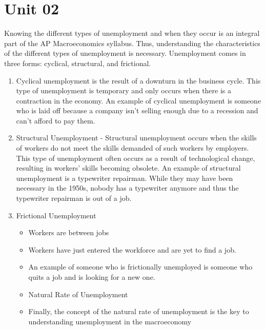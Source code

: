 \documentclass{scrreprt} %
\begin{document}
\section{Unit 02}

Knowing the different types of unemployment and when they occur is an integral
part of the AP Macroeconomics syllabus. Thus, understanding the characteristics
of the different types of unemployment is necessary. Unemployment comes in three
forms: cyclical, structural, and frictional.

\begin{enumerate}
	\item  Cyclical unemployment is the result of a downturn in the business cycle.
This type of unemployment is temporary and only occurs when there is a contraction in the economy.
An example of cyclical unemployment is someone who is laid off because a company isn't selling enough due to a recession and can't afford to pay them.

	\item Structural Unemployment - Structural unemployment occurs when the skills of workers do not meet the skills demanded of such workers by employers.
This type of unemployment often occurs as a result of technological change, resulting in workers’ skills becoming obsolete.
An example of structural unemployment is a typewriter repairman. While they may have been necessary in the 1950s, nobody has a typewriter anymore and thus the typewriter repairman is out of a job.
	\item Frictional Unemployment
\begin{itemize}
	\item Workers are between jobs
	\item Workers have just entered the workforce and are yet to find a job.
	\item An example of someone who is frictionally unemployed is someone who quits a job and is looking for a new one.
	\item Natural Rate of Unemployment
	\item Finally, the concept of the natural rate of unemployment is the key to
	understanding unemployment in the
	macroeconomy
\end{itemize}
\end{enumerate}
\end{document}
